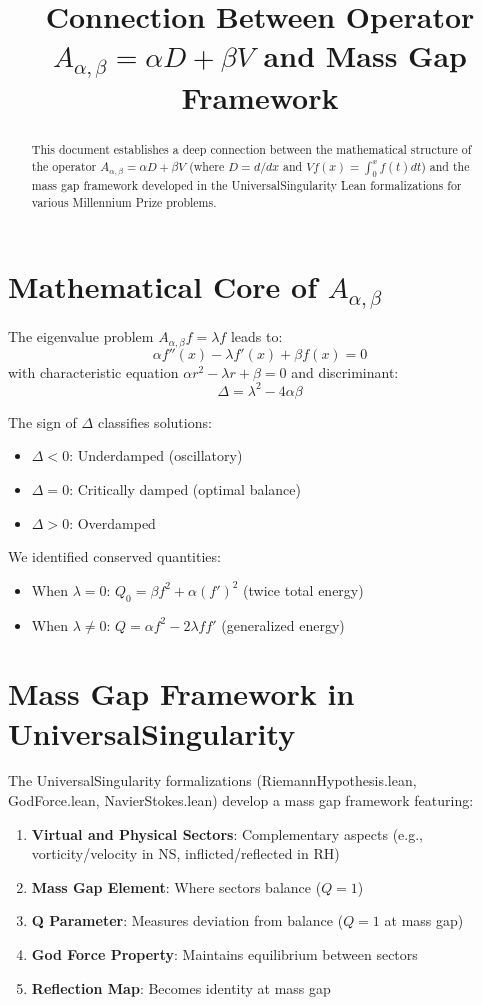 \documentclass[11pt]{article}
\title{Connection Between Operator $A_{\alpha,\beta} = \alpha D + \beta V$ and Mass Gap Framework}
\author{}
\date{}
\begin{document}
\maketitle
\begin{abstract}
This document establishes a deep connection between the mathematical structure of the operator $A_{\alpha,\beta} = \alpha D + \beta V$ (where $D = d/dx$ and $V f(x) = \int_0^x f(t) dt$) and the mass gap framework developed in the UniversalSingularity Lean formalizations for various Millennium Prize problems.
\end{abstract}

\section{Mathematical Core of $A_{\alpha,\beta}$}

The eigenvalue problem $A_{\alpha,\beta} f = \lambda f$ leads to:
$$\alpha f''(x) - \lambda f'(x) + \beta f(x) = 0$$
with characteristic equation $\alpha r^2 - \lambda r + \beta = 0$ and discriminant:
$$\Delta = \lambda^2 - 4\alpha\beta$$

The sign of $\Delta$ classifies solutions:
\begin{itemize}
\item $\Delta < 0$: Underdamped (oscillatory)
\item $\Delta = 0$: Critically damped (optimal balance)
\item $\Delta > 0$: Overdamped
\end{itemize}

We identified conserved quantities:
\begin{itemize}
\item When $\lambda = 0$: $Q_0 = \beta f^2 + \alpha (f')^2$ (twice total energy)
\item When $\lambda \neq 0$: $Q = \alpha f^2 - 2\lambda f f'$ (generalized energy)
\end{itemize}

\section{Mass Gap Framework in UniversalSingularity}

The UniversalSingularity formalizations (RiemannHypothesis.lean, GodForce.lean, NavierStokes.lean) develop a mass gap framework featuring:

\begin{enumerate}
\item \textbf{Virtual and Physical Sectors}: Complementary aspects (e.g., vorticity/velocity in NS, inflicted/reflected in RH)
\item \textbf{Mass Gap Element}: Where sectors balance ($Q = 1$)
\item \textbf{Q Parameter}: Measures deviation from balance ($Q = 1$ at mass gap)
\item \textbf{God Force Property}: Maintains equilibrium between sectors
\item \textbf{Reflection Map}: Becomes identity at mass gap
\end{enumerate}
\end{document}
